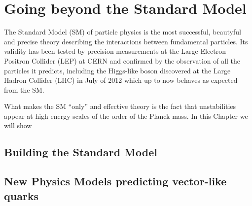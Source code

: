 \clearpage{\pagestyle{empty}\cleardoublepage}

\chapter{Going beyond the Standard Model}\label{chap:TH}

The Standard Model (SM) of particle physics is the most successful, beautyful and precise theory describing the interactions
between fundamental particles. Its validity has been tested by precision measurements at the Large Electron-Positron Collider (LEP)
at CERN and confirmed by the observation of all the particles it predicts, including the Higgs-like boson discovered at the
Large Hadron Collider (LHC) in July of 2012 which up to now behaves as expected from the SM.

What makes the SM ``only'' and effective theory is the fact that unstabilities appear at high energy scales of the order of the
Planck mass. In this Chapter we will show 

\section{Building the Standard Model}\label{sec:THsm}


\section{New Physics Models predicting vector-like quarks}\label{sec:THvlq}

\cite{AguilarSaavedra:2009es,Martin:2009bg}
